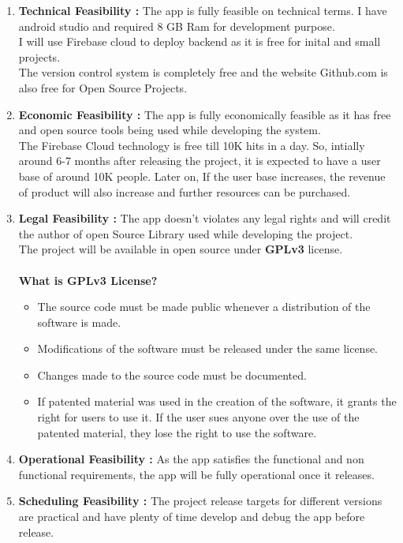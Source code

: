 \begin{enumerate}
	\item \textbf{Technical Feasibility :} The app is fully feasible on technical terms. I have android studio and required 8 GB Ram for development purpose.\\
	I will use Firebase cloud to deploy backend as it is free for inital and small projects.\\
	The version control system is completely free and the website Github.com is also free for Open Source Projects.
	\item \textbf{Economic Feasibility :} The app is fully economically feasible as it has free and open source tools being used while developing the system.\\
	The Firebase Cloud technology is free till 10K hits in a day. So, intially around 6-7 months after releasing the project, it is expected to have a user base of around 10K people. Later on, If the user base increases, the revenue of product will also increase and further resources can be purchased.
	\item \textbf{Legal Feasibility :} The app doesn't violates any legal rights and will credit the author of open Source Library used while developing the project.\\
	The project will be available in open source under \textbf{GPLv3} license.\\
	\\
	\textbf{What is GPLv3 License?}
	\begin{itemize}
		\item The source code must be made public whenever a distribution of the software is made.
		\item Modifications of the software must be released under the same license.
		\item Changes made to the source code must be documented.
		\item If patented material was used in the creation of the software, it grants the right for users to use it. If the user sues anyone over the use of the patented material, they lose the right to use the software.\\
	\end{itemize}
	
	\item \textbf{Operational Feasibility : } As the app satisfies the functional and non functional requirements, the app will be fully operational once it releases.
	
	\item \textbf{Scheduling Feasibility : } The project release targets for different versions are practical and have plenty of time develop and debug the app before release.
\end{enumerate}

